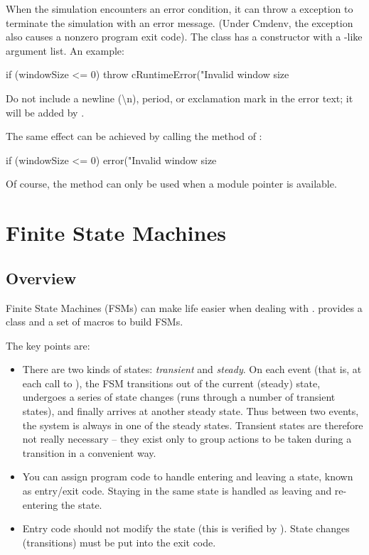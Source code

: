 When the simulation encounters an error condition, it can throw a
 exception to terminate the simulation with an error
message. (Under Cmdenv, the exception also causes a nonzero program exit
code). The  class has a constructor with a
-like argument list. An example:

\begin{cpp}
if (windowSize <= 0)
    throw cRuntimeError("Invalid window size %
\end{cpp}

Do not include a newline ({\textbackslash}n), period, or exclamation mark
in the error text; it will be added by {\opp}.

The same effect can be achieved by calling the  method of
:

\begin{cpp}
if (windowSize <= 0)
    error("Invalid window size %
\end{cpp}

Of course, the  method can only be used when a module pointer
is available.



\section{Finite State Machines}
\label{sec:simple-modules:fsm}

\subsection{Overview}
\label{sec:simple-modules:fsm-overview}

Finite State Machines (FSMs)
can make life easier when dealing with . {\opp} provides a
class and a set of macros to build FSMs.

The key points are:

\begin{itemize}
  \item There are two kinds of states: \textit{transient} and \textit{steady}. On
    each event (that is, at each call to ), the FSM
    transitions out of the current (steady) state, undergoes a series of state
    changes (runs through a number of transient states), and finally arrives at
    another steady state. Thus between two events, the system is always in one of
    the steady states. Transient states are therefore not really necessary -- they
    exist only to group actions to be taken during a transition in a convenient way.
  \item You can assign program code to handle entering and leaving a state, known
    as entry/exit code. Staying in the same state is handled as leaving and
    re-entering the state.
  \item Entry code should not modify the state (this is verified by {\opp}). State
    changes (transitions) must be put into the exit code.
\end{itemize}

